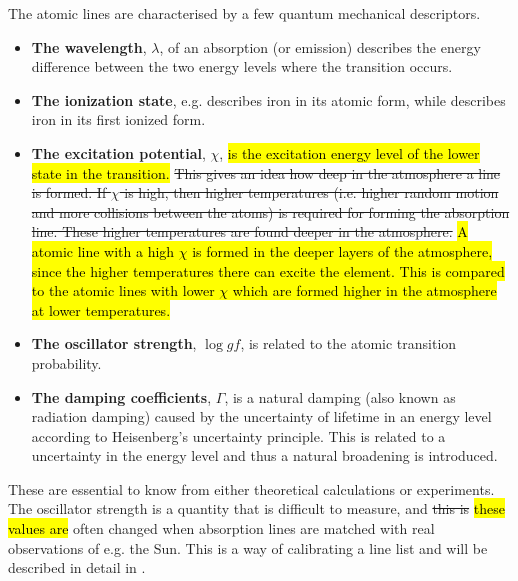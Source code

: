 The atomic lines are characterised by a few quantum mechanical descriptors.
\begin{itemize}
  \item \textbf{The wavelength}, $\lambda$, of an absorption (or emission) describes the energy
        difference between the two energy levels where the transition occurs.
  \item \textbf{The ionization state}, e.g.  describes iron in its atomic form, while
         describes iron in its first ionized form.
  \item \textbf{The excitation potential}, $\chi$, \hl{is the excitation energy level of the lower
        state in the transition.} \st{This gives an idea how deep in the atmosphere a line
        is formed. If $\chi$ is high, then higher temperatures (i.e. higher random motion and more
        collisions between the atoms) is required for forming the absorption line. These higher
        temperatures are found deeper in the atmosphere.} \hl{A atomic line with a high $\chi$ is
        formed in the deeper layers of the atmosphere, since the higher temperatures there can
        excite the element. This is compared to the atomic lines with lower $\chi$ which are formed
        higher in the atmosphere at lower temperatures.}
  \item \textbf{The oscillator strength}, $\log \mathit{gf}$, is related to the atomic transition
        probability.
  \item \textbf{The damping coefficients}, $\Gamma$, is a natural damping (also known as radiation
        damping) caused by the uncertainty of lifetime in an energy level according to Heisenberg's
        uncertainty principle. This is related to a uncertainty in the energy level and thus a
        natural broadening is introduced.
\end{itemize}
These are essential to know from either theoretical calculations or experiments. The oscillator
strength is a quantity that is difficult to measure, and \st{this is} \hl{these values are} often
changed when absorption lines are matched with real observations of e.g. the Sun. This is a way of
calibrating a line list and will be described in detail in .

